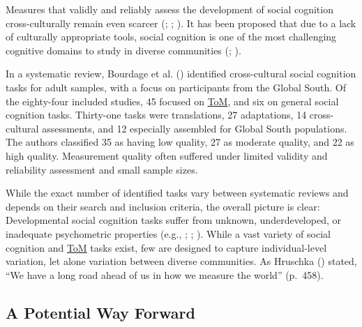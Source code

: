 \documentclass[
]{scrbook}
\begin{document}
Measures that validly and reliably assess the development of social cognition cross-culturally remain even scarcer (; ; ). It has been proposed that due to a lack of culturally appropriate tools, social cognition is one of the most challenging cognitive domains to study in diverse communities (; ).

In a systematic review, Bourdage et al. () identified cross-cultural social cognition tasks for adult samples, with a focus on participants from the Global South. Of the eighty-four included studies, 45 focused on \hyperref[acronyms_ToM]{ToM}, and six on general social cognition tasks. Thirty-one tasks were translations, 27 adaptations, 14 cross-cultural assessments, and 12 especially assembled for Global South populations. The authors classified 35 as having low quality, 27 as moderate quality, and 22 as high quality. Measurement quality often suffered under limited validity and reliability assessment and small sample sizes.

While the exact number of identified tasks vary between systematic reviews and depends on their search and inclusion criteria, the overall picture is clear: Developmental social cognition tasks suffer from unknown, underdeveloped, or inadequate psychometric properties (e.g., ; ; ). While a vast variety of social cognition and \hyperref[acronyms_ToM]{ToM} tasks exist, few are designed to capture individual-level variation, let alone variation between diverse communities. As Hruschka () stated, ``We have a long road ahead of us in how we measure the world'' (p.~458).

\subsection{A Potential Way Forward}\label{a-potential-way-forward}
\end{document}
